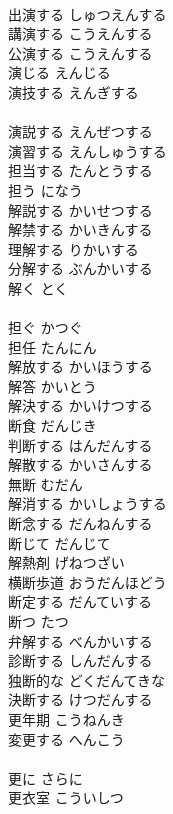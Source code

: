 \documentclass[8pt]{extreport}
\begin{document}
\begin{CJK}{UTF8}{min}
\\	出演する	しゅつえんする	
\\	講演する	こうえんする	
\\	公演する	こうえんする	
\\	演じる	えんじる	
\\	演技する	えんぎする	
\\	[漢語]
\\	演説する	えんぜつする	
\\	演習する	えんしゅうする	
\\	担当する	たんとうする	
\\	担う	になう	
\\	解説する	かいせつする	
\\	解禁する	かいきんする	
\\	理解する	りかいする	
\\	分解する	ぶんかいする	
\\	解く	とく	
\\	[和語]
\\	担ぐ	かつぐ	
\\	担任	たんにん	
\\	解放する	かいほうする	
\\	解答	かいとう	
\\	解決する	かいけつする	
\\	断食	だんじき	
\\	判断する	はんだんする	
\\	解散する	かいさんする	
\\	無断	むだん	
\\	解消する	かいしょうする	
\\	断念する	だんねんする	
\\	断じて	だんじて	
\\	解熱剤	げねつざい	
\\	横断歩道	おうだんほどう	
\\	断定する	だんていする	
\\	断つ	たつ	
\\	弁解する	べんかいする	
\\	診断する	しんだんする	
\\	独断的な	どくだんてきな	
\\	決断する	けつだんする	
\\	更年期	こうねんき	
\\	変更する	へんこう	
\\	[漢語]
\\	更に	さらに	
\\	更衣室	こういしつ	

\end{CJK}
\end{document}
